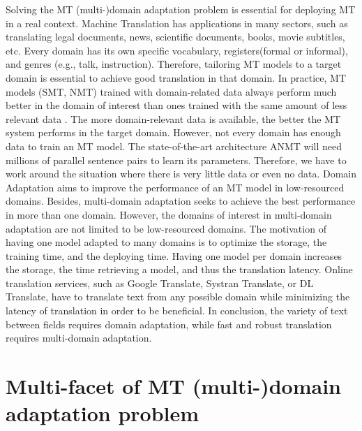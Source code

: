 Solving the MT (multi-)domain adaptation problem is essential for deploying MT in a real context. Machine Translation has applications in many sectors, such as translating legal documents, news, scientific documents, books, movie subtitles, etc. Every domain has its own specific vocabulary, registers(formal or informal), and genres (e.g., talk, instruction). Therefore, tailoring MT models to a target domain is essential to achieve good translation in that domain. In practice, MT models (SMT, NMT) trained with domain-related data always perform much better in the domain of interest than ones trained with the same amount of less relevant data \citep{Rico13domain, Saunders21Domain}. The more domain-relevant data is available, the better the MT system performs in the target domain. However, not every domain has enough data to train an MT model. The state-of-the-art architecture ANMT will need millions of parallel sentence pairs to learn its parameters. Therefore, we have to work around the situation where there is very little data or even no data. Domain Adaptation aims to improve the performance of an MT model in low-resourced domains. Besides, multi-domain adaptation seeks to achieve the best performance in more than one domain. However, the domains of interest in multi-domain adaptation are not limited to be low-resourced domains. The motivation of having one model adapted to many domains is to optimize the storage, the training time, and the deploying time. Having one model per domain increases the storage, the time retrieving a model, and thus the translation latency. Online translation services, such as Google Translate, Systran Translate, or DL Translate, have to translate text from any possible domain while minimizing the latency of translation in order to be beneficial. In conclusion, the variety of text between fields requires domain adaptation, while fast and robust translation requires multi-domain adaptation.

\section{Multi-facet of MT (multi-)domain adaptation problem}
\label{sec:multi-facet}
